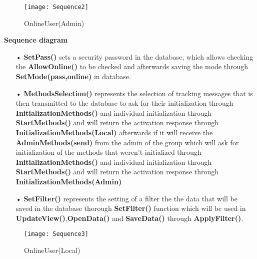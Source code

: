 \newpage
\begin{figure}[!h]
	\centering
\texttt{[image: Sequence2]}
	\caption{OnlineUser(Admin)} 
\end{figure}
\newpage
\textbf{Sequence diagram} 
\begin{itemize}
\item[•] \textbf{SetPass()} sets a security password in the database, which allows checking the \textbf{AllowOnline()} to be checked and afterwards saving the mode through \textbf{SetMode(pass,online)} in database.
\item[•] \textbf{MethodsSelection()} represents the selection of tracking messages that is then transmitted to the database to ask for their initialization through \textbf{InitializationMethods()} and individual initialization through \textbf{StartMethods()} and will return the activation response through \textbf{InitializationMethods(Local)} afterwards 
if it will receive the \textbf{AdminMethods(send)} from the admin of the group which will ask for initialization of the methods that weren't initialized through \textbf{InitializationMethods()} and individual initialization through \textbf{StartMethods()} and will return the activation response through \textbf{InitializationMethods(Admin)}
\item[•] \textbf{SetFilter()} represents the setting of a filter the the data that will be saved in the database thorough \textbf{SetFilter()} function which will be used in \textbf{UpdateView()},\textbf{OpenData()} and \textbf{SaveData()} through \textbf{ApplyFilter()}.
\end{itemize}
\newpage
\begin{figure}[!h]
	\centering
	\texttt{[image: Sequence3]}
	\caption{OnlineUser(Local)} 
\end{figure}
\newpage
